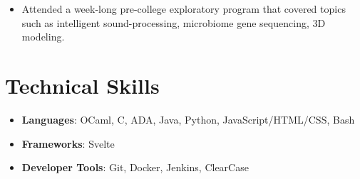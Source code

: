 \documentclass[letterpaper,8pt]{article}
\newcommand{\itemsBegin}{
    \begin{itemize}[leftmargin=0.2in, labelsep=0.05in, itemsep=0pt, parsep=1pt, topsep=0pt, partopsep=0pt]
}
\newcommand{\itemsEnd}{\end{itemize}}
\begin{document}
    \itemsBegin
        \item Attended a week-long pre-college exploratory program that covered topics such as intelligent sound-processing, microbiome gene sequencing, 3D modeling.
    \itemsEnd

\section{Technical Skills}

    \itemsBegin
        \item \textbf{Languages}{: OCaml, C, ADA, Java, Python, JavaScript/HTML/CSS, Bash}
        \item \textbf{Frameworks}{: Svelte}
        \item \textbf{Developer Tools}{: Git, Docker, Jenkins, ClearCase}
    \itemsEnd

\end{document}
